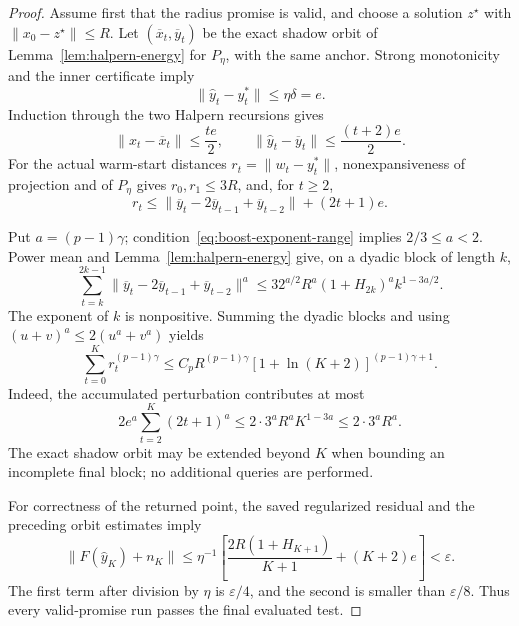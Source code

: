 \documentclass[11pt]{article}
\numberwithin{equation}{section}
\theoremstyle{definition}
\theoremstyle{remark}
\begin{document}
\begin{proof}
Assume first that the radius promise is valid, and choose a solution
\(z^\star\) with \(\|x_0-z^\star\|\le R\). Let
\((\overline x_t,\overline y_t)\) be the exact shadow orbit of
Lemma~\ref{lem:halpern-energy} for \(P_\eta\), with the same anchor.
Strong monotonicity and the inner certificate imply
\[
\|\widehat y_t-y_t^*\|\le\eta\delta=e.
\]
Induction through the two Halpern recursions gives
\[
\|x_t-\overline x_t\|\le\frac{te}{2},\qquad
\|\widehat y_t-\overline y_t\|\le\frac{(t+2)e}{2}.
\]
For the actual warm-start distances \(r_t=\|w_t-y_t^*\|\),
nonexpansiveness of projection and of \(P_\eta\) gives
\(r_0,r_1\le3R\), and, for \(t\ge2\),
\[
r_t\le
\|\overline y_t-2\overline y_{t-1}+\overline y_{t-2}\|
+(2t+1)e.
\]

Put \(a=(p-1)\gamma\); condition~\eqref{eq:boost-exponent-range} implies
\(2/3\le a<2\). Power mean and
Lemma~\ref{lem:halpern-energy} give, on a dyadic block of length \(k\),
\[
\sum_{t=k}^{2k-1}
\|\overline y_t-2\overline y_{t-1}+\overline y_{t-2}\|^a
\le32^{a/2}R^a(1+H_{2k})^a k^{1-3a/2}.
\]
The exponent of \(k\) is nonpositive. Summing the dyadic blocks and
using \((u+v)^a\le2(u^a+v^a)\) yields
\begin{equation}\label{eq:warm-start-sum}
\sum_{t=0}^{K}r_t^{(p-1)\gamma}
\le C_pR^{(p-1)\gamma}
            [1+\ln(K+2)]^{(p-1)\gamma+1}.
\end{equation}
Indeed, the accumulated perturbation contributes at most
\[
2e^a\sum_{t=2}^{K}(2t+1)^a
\le2\cdot3^aR^a K^{1-3a}\le2\cdot3^aR^a.
\]
The exact shadow orbit may be extended beyond \(K\) when bounding an
incomplete final block; no additional queries are performed.

For correctness of the returned point, the saved regularized residual
and the preceding orbit estimates imply
\begin{equation}\label{eq:boost-certificate}
\|F(\widehat y_K)+n_K\|
\le\eta^{-1}\left[
\frac{2R(1+H_{K+1})}{K+1}+(K+2)e\right]
<\varepsilon.
\end{equation}
The first term after division by \(\eta\) is \(\varepsilon/4\),
and the second is smaller than \(\varepsilon/8\). Thus every
valid-promise run passes the final evaluated test.


\end{proof}
\end{document}
